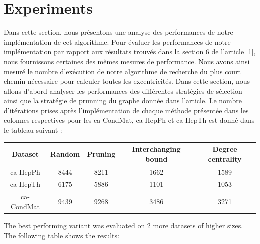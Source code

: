 \documentclass[11pt]{article}
\begin{document}
\section{Experiments}
Dans cette section, nous présentons une analyse des performances de notre
implémentation de cet algorithme. Pour évaluer les performances de notre
implémentation par rapport aux résultats trouvés dans la section 6 de l'article
[1], nous fournissons certaines des mêmes mesures de performance. Nous avons
ainsi mesuré le nombre d'exécution de notre algorithme de recherche du plus
court chemin nécessaire pour calculer toutes les excentricités. Dans cette
section, nous allons d'abord analyser les performances des différentes
stratégies de sélection ainsi que la stratégie de prunning du graphe donnée dans
l'article. Le nombre d'itérations prises après l'implémentation de chaque
méthode présentée dans les colonnes respectives pour les ca-CondMat, ca-HepPh et
ca-HepTh est donné dans le tableau suivant :\\
\begin{center}
 \begin{tabular}{||c c c c c||} 
   \hline
   Dataset & Random & Pruning & Interchanging bound & Degree centrality \\
   \hline\hline
   ca-HepPh & 8444 & 8211 & 1662 & 1589 \\
   \hline
   ca-HepTh & 6175 & 5886 & 1101 & 1053 \\
   \hline
   ca-CondMat & 9439 & 9268 & 3486 & 3271 \\ 
   \hline
 \end{tabular}
\end{center}
\medskip
\noindent
The best performing variant was evaluated on 2 more datasets of higher
sizes. The following table shows the results:\\
\end{document}
